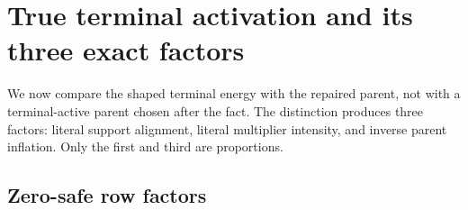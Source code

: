 \section{True terminal activation and its three exact factors}
\label{sec:tpc64-activation-factorization}

We now compare the shaped terminal energy with the repaired parent, not
with a terminal-active parent chosen after the fact.  The distinction
produces three factors: literal support alignment, literal multiplier
intensity, and inverse parent inflation.  Only the first and third are
proportions.

\subsection{Zero-safe row factors}

